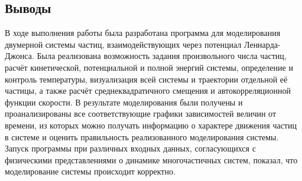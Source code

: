\documentclass[14pt,a4paper,report]{ncc}
\begin{document}
\subsection{Выводы}
В ходе выполнения работы была разработана программа для моделирования двумерной системы частиц, взаимодействующих через потенциал Леннарда-Джонса. Была реализована возможность задания произвольного числа частиц, расчёт кинетической, потенциальной и полной энергий системы, определение и контроль температуры, визуализация всей системы и траектории отдельной её частицы, а также расчёт среднеквадратичного смещения и автокорреляционной функции скорости. В результате моделирования были получены и проанализированы все соответствующие графики зависимостей величин от времени, из которых можно получать информацию о характере движения частиц в системе и оценить правильность реализованного моделирования системы. Запуск программы при различных входных данных, согласующихся с физическими представлениями о динамике многочастичных систем, показал, что моделирование системы происходит корректно.
\end{document}
